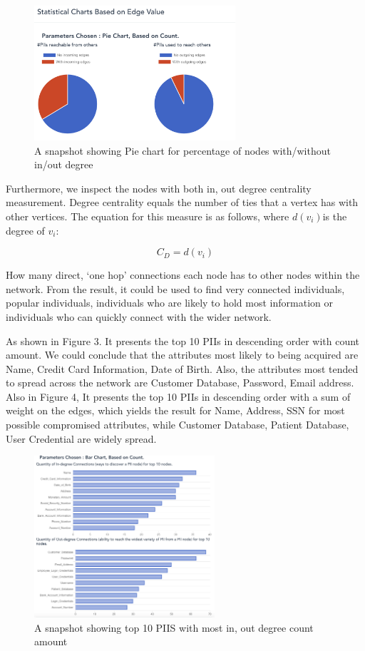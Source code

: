 \documentclass[letterpaper, 10 pt, conference]{ieeeconf}  %
\begin{document}
\begin{figure}[h!]
  \includegraphics[width=\linewidth, height=5cm]{pic2.png}
  \caption{A snapshot showing Pie chart for percentage of nodes with/without in/out degree}
  \label{fig:pic2}
\end{figure}

Furthermore, we inspect the nodes with both in, out degree centrality measurement. Degree centrality equals the number of ties that a vertex has with other vertices. The equation for this measure is as follows, where $d(v_{i})$is the degree of $v_{i}$: 

\begin{equation}
C_{D} = d(v_{i})
\label{P}
\end{equation}

How many direct, ‘one hop’ connections each node has to other nodes within the network. From the result, it could be used to find very connected individuals, popular individuals, individuals who are likely to hold most information or individuals who can quickly connect with the wider network. 

As shown in Figure 3. It presents the top 10 PIIs in descending order with count amount. We could conclude that the attributes most likely to being acquired are Name, Credit Card Information, Date of Birth. Also, the attributes most tended to spread across the network are Customer Database, Password, Email address. Also in Figure 4, It presents the top 10 PIIs in descending order with a sum of weight on the edges, which yields the result for Name, Address, SSN for most possible compromised attributes, while Customer Database, Patient Database, User Credential are widely spread.

\begin{figure}[h!]
  \includegraphics[width=\linewidth, height=6cm]{pic3.png}
  \caption{A snapshot showing top 10 PIIS with most in, out degree count amount}
  \label{fig:pic2}
\end{figure}
\end{document}
